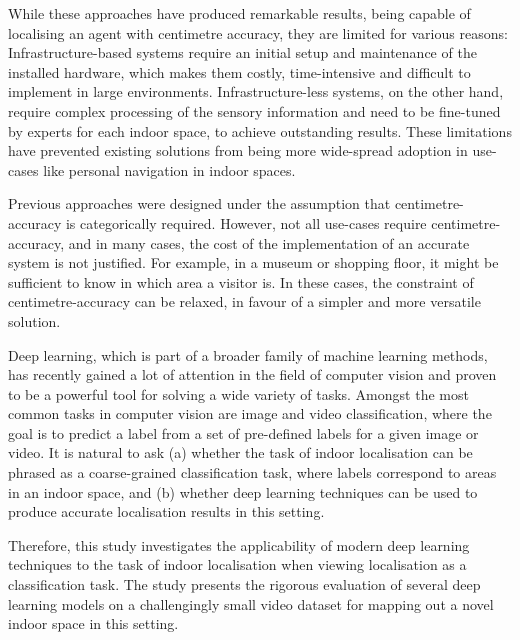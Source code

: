 \documentclass[a4paper]{article}
\begin{document}
While these approaches have produced remarkable results, being capable of
localising an agent with centimetre accuracy, they are limited for various
reasons: Infrastructure-based systems require an initial setup and maintenance
of the installed hardware, which makes them costly, time-intensive and difficult
to implement in large environments. Infrastructure-less systems, on the other
hand, require complex processing of the sensory information and need to be
fine-tuned by experts for each indoor space, to achieve outstanding results.
These limitations have prevented existing solutions from being more wide-spread
adoption in use-cases like personal navigation in indoor spaces.

Previous approaches were designed under the assumption that centimetre-accuracy
is categorically required. However, not all use-cases require
centimetre-accuracy, and in many cases, the cost of the implementation of an
accurate system is not justified. For example, in a museum or shopping floor, it
might be sufficient to know in which area a visitor is. In these cases, the
constraint of centimetre-accuracy can be relaxed, in favour of a simpler and
more versatile solution.


Deep learning, which is part of a broader family of machine learning methods,
has recently gained a lot of attention in the field of computer vision and
proven to be a powerful tool for solving a wide variety of tasks. Amongst the
most common tasks in computer vision are image and video classification, where
the goal is to predict a label from a set of pre-defined labels for a given
image or video. It is natural to ask (a) whether the task of indoor
localisation can be phrased as a coarse-grained classification task, where
labels correspond to areas in an indoor space, and (b) whether deep learning
techniques can be used to produce accurate localisation results in this setting.

Therefore, this study investigates the applicability of modern deep learning
techniques to the task of indoor localisation when viewing localisation as a
classification task. The study presents the rigorous evaluation of several deep
learning models on a challengingly small video dataset for mapping out a novel
indoor space in this setting.
\end{document}
